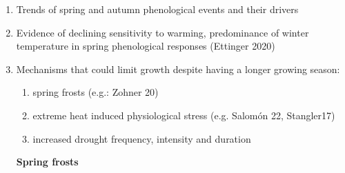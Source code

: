 \documentclass{article}
\begin{document}
\begin{enumerate}
	\item  Trends of spring and autumn phenological events and their drivers \citep{walther_ecological_2002}
	\item Evidence of declining sensitivity to warming, predominance of winter temperature in spring phenological responses (Ettinger 2020)
	\item Mechanisms that could limit growth despite having a longer growing season:
		\begin{enumerate} 
			\item spring frosts (e.g.: Zohner 20)
			\item extreme heat induced physiological stress (e.g. Salomón 22, Stangler17)
			\item increased drought frequency, intensity and duration 
		\end{enumerate}
		\textbf{Spring frosts} \\
\end{enumerate}
\end{document}
